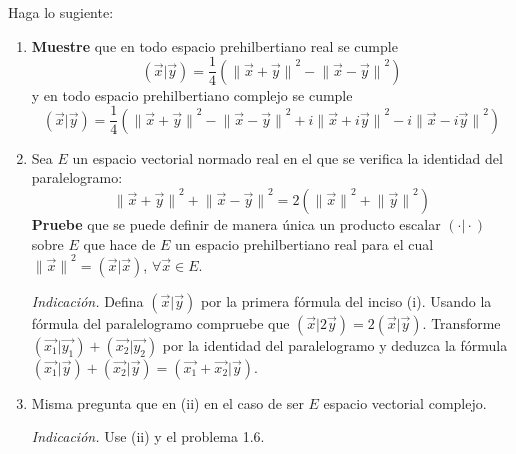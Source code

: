 \documentclass[12pt]{report}
\newcounter{it}
\theoremstyle{largebreak}
\newcommand\pint[2]{\ensuremath{\left(#1\big|#2\right)}}
\newcommand\norm[1]{\ensuremath{\|#1\|}}
\begin{document}
    \begin{excer}
        Haga lo sugiente:
        \begin{enumerate}
            \item \textbf{Muestre} que en todo espacio prehilbertiano real se cumple
            \begin{equation*}
                \pint{\vec{x}}{\vec{y}}=\frac{1}{4}\left(\norm{\vec{x}+\vec{y}}^2-\norm{\vec{x}-\vec{y}}^2 \right)
            \end{equation*}
            y en todo espacio prehilbertiano complejo se cumple
            \begin{equation*}
                \pint{\vec{x}}{\vec{y}}=\frac{1}{4}\left(\norm{\vec{x}+\vec{y}}^2-\norm{\vec{x}-\vec{y}}^2+i\norm{\vec{x}+i\vec{y}}^2-i\norm{\vec{x}-i\vec{y}}^2 \right)
            \end{equation*}
            \item Sea $E$ un espacio vectorial normado real en el que se verifica la identidad del paralelogramo:
            \begin{equation*}
                \norm{\vec{x}+\vec{y}}^2+\norm{\vec{x}-\vec{y}}^2=2(\norm{\vec{x}}^2+\norm{\vec{y}}^2)
            \end{equation*}
            \textbf{Pruebe} que se puede definir de manera única un producto escalar $\pint{\cdot}{\cdot}$ sobre $E$ que hace de $E$ un espacio prehilbertiano real para el cual $\norm{\vec{x}}^2=\pint{\vec{x}}{\vec{x}}$, $\forall\vec{x}\in E$.

            \textit{Indicación.} Defina $\pint{\vec{x}}{\vec{y}}$ por la primera fórmula del inciso (i). Usando la fórmula del paralelogramo compruebe que $\pint{\vec{x}}{2\vec{y}}=2\pint{\vec{x}}{\vec{y}}$. Transforme $\pint{\vec{x_1}}{\vec{y_1}}+\pint{\vec{x_2}}{\vec{y_2}}$ por la identidad del paralelogramo y deduzca la fórmula $\pint{\vec{x_1}}{\vec{y}}+\pint{\vec{x_2}}{\vec{y}}=\pint{\vec{x_1}+\vec{x_2}}{\vec{y}}$.

            \item Misma pregunta que en (ii) en el caso de ser $E$ espacio vectorial complejo. 
            
            \textit{Indicación.} Use (ii) y el problema 1.6.
        \end{enumerate}
    \end{excer}
\end{document}
